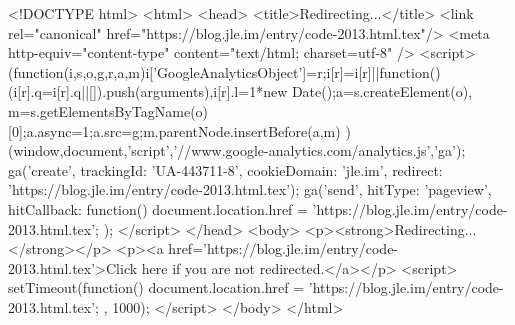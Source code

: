 <!DOCTYPE html>
<html>
<head>
<title>Redirecting...</title>
<link rel="canonical" href="https://blog.jle.im/entry/code-2013.html.tex"/>
<meta http-equiv="content-type" content="text/html; charset=utf-8" />
<script>
(function(i,s,o,g,r,a,m){i['GoogleAnalyticsObject']=r;i[r]=i[r]||function(){
(i[r].q=i[r].q||[]).push(arguments)},i[r].l=1*new Date();a=s.createElement(o),
m=s.getElementsByTagName(o)[0];a.async=1;a.src=g;m.parentNode.insertBefore(a,m)
})(window,document,'script','//www.google-analytics.com/analytics.js','ga');
ga('create', { trackingId: 'UA-443711-8', cookieDomain: 'jle.im', redirect: 'https://blog.jle.im/entry/code-2013.html.tex'});
ga('send', { hitType: 'pageview', hitCallback: function() { document.location.href = 'https://blog.jle.im/entry/code-2013.html.tex'; } });
</script>
</head>
<body>
  <p><strong>Redirecting...</strong></p>
  <p><a href='https://blog.jle.im/entry/code-2013.html.tex'>Click here if you are not redirected.</a></p>
  <script>
    setTimeout(function() { document.location.href = 'https://blog.jle.im/entry/code-2013.html.tex'; }, 1000);
  </script>
</body>
</html>
